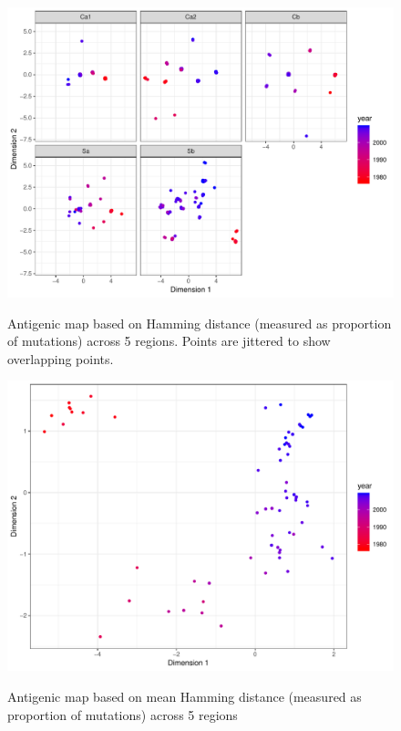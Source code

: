 \documentclass[12pt]{article}
\begin{document}
\begin{figure}
\includegraphics[width=\textwidth]{../figure/individual_map.pdf}
\label{fig:ind}
\caption{Antigenic map based on Hamming distance (measured as proportion of mutations) across 5 regions. Points are jittered to show overlapping points.}
\end{figure}

\begin{figure}
\includegraphics[width=\textwidth]{../figure/average_map.pdf}
\label{fig:avg}
\caption{Antigenic map based on mean Hamming distance (measured as proportion of mutations) across 5 regions}
\end{figure}
\end{document}
